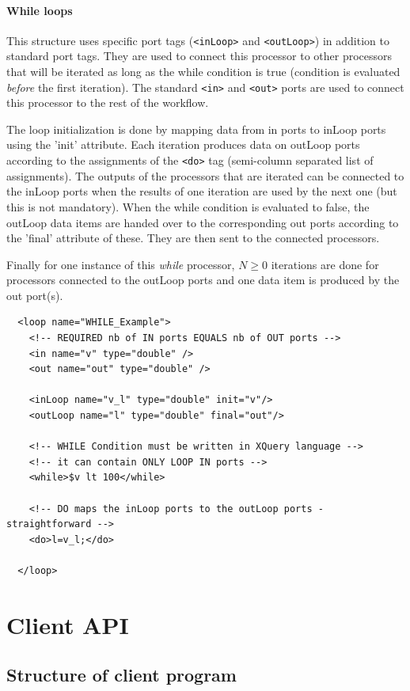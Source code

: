 \paragraph{While loops}  
This structure uses specific port tags (\texttt{<inLoop>} and
\texttt{<outLoop>}) in addition to standard port tags. They are used to connect
this processor to other processors that will be iterated as long as the while
condition is true (condition is evaluated \textit{before} the first
iteration). The standard \texttt{<in>} and \texttt{<out>} ports are used to
connect this processor to the rest of the workflow.

The loop initialization is done by mapping data from in ports to inLoop ports
using the 'init' attribute. Each iteration produces data on outLoop ports
according to the assignments of the \texttt{<do>} tag (semi-column separated
list of assignments). The outputs of the processors that are iterated can be
connected to the inLoop ports when the results of one iteration are used by the
next one (but this is not mandatory). When the while condition is evaluated to
false, the outLoop data items are handed over to the corresponding out ports
according to the 'final' attribute of these. They are then sent to the
connected processors.

Finally for one instance of this \textit{while} processor, $N \geq 0$
iterations are done for processors connected to the outLoop ports and one data
item is produced by the out port(s).

\begin{verbatim}
  <loop name="WHILE_Example">
    <!-- REQUIRED nb of IN ports EQUALS nb of OUT ports -->
    <in name="v" type="double" />
    <out name="out" type="double" />

    <inLoop name="v_l" type="double" init="v"/>
    <outLoop name="l" type="double" final="out"/>

    <!-- WHILE Condition must be written in XQuery language -->
    <!-- it can contain ONLY LOOP IN ports -->
    <while>$v lt 100</while>

    <!-- DO maps the inLoop ports to the outLoop ports - straightforward -->
    <do>l=v_l;</do>

  </loop>
\end{verbatim}

\section{Client API}

\subsection{Structure of client program}
\label{sec:client_prg}

